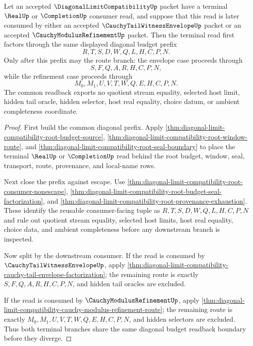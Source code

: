 \begin{theorem}
\label{thm:diagonal-limit-compatibility-terminal-budget-readback}
Let an accepted $\DiagonalLimitCompatibilityUp$ packet have a terminal $\RealUp$ or $\CompletionUp$ consumer read, and suppose that this read is later consumed by either an accepted $\CauchyTailWitnessEnvelopeUp$ packet or an accepted $\CauchyModulusRefinementUp$ packet. Then the terminal read first factors through the same displayed diagonal budget prefix
$$
R,T,S,D,W,Q,L,H,C,P,N.
$$
Only after this prefix may the route branch: the envelope case proceeds through
$$
S,F,Q,A,R,H,C,P,N,
$$
while the refinement case proceeds through
$$
M_0,M_1,U,V,T,W,Q,E,H,C,P,N.
$$
The common readback exports no quotient stream equality, selected host limit, hidden tail oracle, hidden selector, host real equality, choice datum, or ambient completeness coordinate.
\end{theorem}
\begin{proof}
First build the common diagonal prefix. Apply \autoref{thm:diagonal-limit-compatibility-root-budget-source}, \autoref{thm:diagonal-limit-compatibility-root-window-route}, and \autoref{thm:diagonal-limit-compatibility-root-seal-boundary} to place the terminal $\RealUp$ or $\CompletionUp$ read behind the root budget, window, seal, transport, route, provenance, and local-name rows.

Next close the prefix against escape. Use \autoref{thm:diagonal-limit-compatibility-root-consumer-nonescape}, \autoref{thm:diagonal-limit-compatibility-root-budget-seal-factorization}, and \autoref{thm:diagonal-limit-compatibility-root-provenance-exhaustion}. These identify the reusable consumer-facing tuple as $R,T,S,D,W,Q,L,H,C,P,N$ and rule out quotient stream equality, selected host limits, host real equality, choice data, and ambient completeness before any downstream branch is inspected.

Now split by the downstream consumer. If the read is consumed by $\CauchyTailWitnessEnvelopeUp$, apply \autoref{thm:diagonal-limit-compatibility-cauchy-tail-envelope-factorization}; the remaining route is exactly $S,F,Q,A,R,H,C,P,N$, and hidden tail oracles are excluded.

If the read is consumed by $\CauchyModulusRefinementUp$, apply \autoref{thm:diagonal-limit-compatibility-cauchy-modulus-refinement-route}; the remaining route is exactly $M_0,M_1,U,V,T,W,Q,E,H,C,P,N$, and hidden selectors are excluded. Thus both terminal branches share the same diagonal budget readback boundary before they diverge.
\end{proof}

